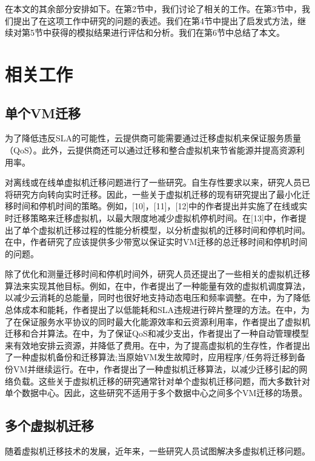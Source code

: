 在本文的其余部分安排如下。在第2节中，我们讨论了相关的工作。在第3节中，我们提出了在这项工作中研究的问题的表述。我们在第4节中提出了启发式方法，继续对第5节中获得的模拟结果进行评估和分析。我们在第6节中总结了本文。

\chapter{相关工作}

\section{单个VM迁移}
为了降低违反SLA的可能性，云提供商可能需要通过迁移虚拟机来保证服务质量（QoS）。此外，云提供商还可以通过迁移和整合虚拟机来节省能源并提高资源利用率。

对离线或在线单虚拟机迁移问题进行了一些研究\cite{khazaei2013performance, zhang2014delay, ding2015energy, rao2015heuristics, chen2014consolidating, mohamed2015autonomic, xu2013enhancing, huang2013multi}。自生存性要求以来，研究人员已将研究方向转向实时迁移。因此，一些关于虚拟机迁移的现有研究提出了最小化迁移时间和停机时间的策略。例如，[10]，[11]，[12]中的作者提出并实施了在线或实时迁移策略来迁移虚拟机，以最大限度地减少虚拟机停机时间。在[13]中，作者提出了单个虚拟机迁移过程的性能分析模型，以分析虚拟机的迁移时间和停机时间。在\cite{zhang2014delay}中，作者研究了应该提供多少带宽以保证实时VM迁移的总迁移时间和停机时间的问题。

除了优化和测量迁移时间和停机时间外，研究人员还提出了一些相关的虚拟机迁移算法来实现其他目标。例如，在\cite{ding2015energy}中，作者提出了一种能量有效的虚拟机调度算法，以减少云消耗的总能量，同时也很好地支持动态电压和频率调整。在\cite{rao2015heuristics}中，为了降低总体成本和能耗，作者提出了以低能耗和SLA违规进行碎片整理的方法。在\cite{chen2014consolidating}中，为了在保证服务水平协议的同时最大化能源效率和云资源利用率，作者提出了虚拟机迁移和合并算法。在\cite{mohamed2015autonomic}中，为了保证QoS和减少支出，作者提出了一种自动管理模型来有效地安排云资源，并降低了费用。在\cite{xu2013enhancing}中，为了提高虚拟机的生存性，作者提出了一种虚拟机备份和迁移算法;当原始VM发生故障时，应用程序/任务将迁移到备份VM并继续运行。在\cite{huang2013multi}中，作者提出了一种虚拟机迁移算法，以减少迁移引起的网络负载。这些关于虚拟机迁移的研究通常针对单个虚拟机迁移问题，而大多数针对单个数据中心。因此，这些研究不适用于多个数据中心之间多个VM迁移的场景。

\section{多个虚拟机迁移}
随着虚拟机迁移技术的发展，近年来，一些研究人员试图解决多虚拟机迁移问题。

